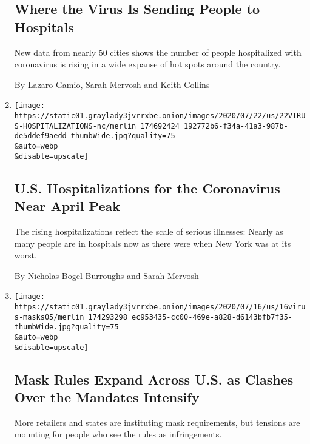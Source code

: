 \begin{enumerate}
  \hypertarget{where-the-virus-is-sending-people-to-hospitals}{%
  \subsection{Where the Virus Is Sending People to
  Hospitals}\label{where-the-virus-is-sending-people-to-hospitals}}

  New data from nearly 50 cities shows the number of people hospitalized
  with coronavirus is rising in a wide expanse of hot spots around the
  country.

  By Lazaro Gamio, Sarah Mervosh and Keith Collins
\item
  \href{/2020/07/22/us/coronavirus-hospitalizations-near-peak.html}{}

  \texttt{[image: https://static01.graylady3jvrrxbe.onion/images/2020/07/22/us/22VIRUS-HOSPITALIZATIONS-nc/merlin\_174692424\_192772b6-f34a-41a3-987b-de5ddef9aedd-thumbWide.jpg?quality=75\\\&auto=webp\\\&disable=upscale]}

  \hypertarget{us-hospitalizations-for-the-coronavirus-near-april-peak}{%
  \subsection{U.S. Hospitalizations for the Coronavirus Near April
  Peak}\label{us-hospitalizations-for-the-coronavirus-near-april-peak}}

  The rising hospitalizations reflect the scale of serious illnesses:
  Nearly as many people are in hospitals now as there were when New York
  was at its worst.

  By Nicholas Bogel-Burroughs and Sarah Mervosh
\item
  \href{/2020/07/16/us/coronavirus-masks.html}{}

  \texttt{[image: https://static01.graylady3jvrrxbe.onion/images/2020/07/16/us/16virus-masks05/merlin\_174293298\_ec953435-cc00-469e-a828-d6143bfb7f35-thumbWide.jpg?quality=75\\\&auto=webp\\\&disable=upscale]}

  \hypertarget{mask-rules-expand-across-us-as-clashes-over-the-mandates-intensify}{%
  \subsection{Mask Rules Expand Across U.S. as Clashes Over the Mandates
  Intensify}\label{mask-rules-expand-across-us-as-clashes-over-the-mandates-intensify}}

  More retailers and states are instituting mask requirements, but
  tensions are mounting for people who see the rules as infringements.


\end{enumerate}
